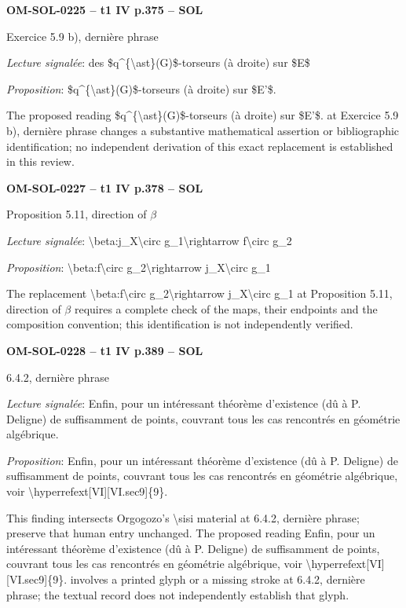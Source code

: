 \par\noindent\textbf{OM-SOL-0225 -- t1 IV p.375 -- SOL}\par
Exercice 5.9 b), dernière phrase\par
\emph{Lecture signalée}: des \$q\textasciicircum{}\{\textbackslash{}ast\}(G)\$-torseurs (à droite) sur \$E\$\par
\emph{Proposition}: \$q\textasciicircum{}\{\textbackslash{}ast\}(G)\$-torseurs (à droite) sur \$E'\$.\par
The proposed reading \$q\textasciicircum{}\{\textbackslash{}ast\}(G)\$-torseurs (à droite) sur \$E'\$. at Exercice 5.9 b), dernière phrase changes a substantive mathematical assertion or bibliographic identification; no independent derivation of this exact replacement is established in this review.\par
\par\noindent\textbf{OM-SOL-0227 -- t1 IV p.378 -- SOL}\par
Proposition 5.11, direction of \ensuremath{\beta}\par
\emph{Lecture signalée}: \textbackslash{}beta:j\_X\textbackslash{}circ g\_1\textbackslash{}rightarrow f\textbackslash{}circ g\_2\par
\emph{Proposition}: \textbackslash{}beta:f\textbackslash{}circ g\_2\textbackslash{}rightarrow j\_X\textbackslash{}circ g\_1\par
The replacement \textbackslash{}beta:f\textbackslash{}circ g\_2\textbackslash{}rightarrow j\_X\textbackslash{}circ g\_1 at Proposition 5.11, direction of \ensuremath{\beta} requires a complete check of the maps, their endpoints and the composition convention; this identification is not independently verified.\par
\par\noindent\textbf{OM-SOL-0228 -- t1 IV p.389 -- SOL}\par
6.4.2, dernière phrase\par
\emph{Lecture signalée}: Enfin, pour un intéressant théorème d'existence (dû à P. Deligne) de suffisamment de points, couvrant tous les cas rencontrés en géométrie algébrique.\par
\emph{Proposition}: Enfin, pour un intéressant théorème d'existence (dû à P. Deligne) de suffisamment de points, couvrant tous les cas rencontrés en géométrie algébrique, voir \textbackslash{}hyperrefext[VI][VI.sec9]\{9\}.\par
This finding intersects Orgogozo's \textbackslash{}sisi material at 6.4.2, dernière phrase; preserve that human entry unchanged. The proposed reading Enfin, pour un intéressant théorème d'existence (dû à P. Deligne) de suffisamment de points, couvrant tous les cas rencontrés en géométrie algébrique, voir \textbackslash{}hyperrefext[VI][VI.sec9]\{9\}. involves a printed glyph or a missing stroke at 6.4.2, dernière phrase; the textual record does not independently establish that glyph.\par
